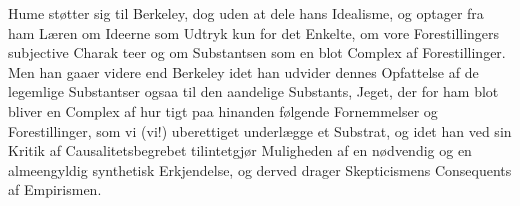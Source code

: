 \documentclass[12pt,a4paper]{book}
\begin{document}
Hume støtter sig til Berkeley, dog uden at dele hans
Idealisme, og optager fra ham Læren om Ideerne som Udtryk
kun for det Enkelte, om vore Forestillingers subjective Charak\-%
teer og om Substantsen som en blot Complex af Forestillinger.
Men han gaaer videre end Berkeley idet han udvider dennes
Opfattelse af de legemlige Substantser ogsaa til den aandelige
Substants, Jeget, der for ham blot bliver en Complex af hur\-%
tigt paa hinanden følgende Fornemmelser og Forestillinger,
som vi (vi!) uberettiget underlægge et Substrat, og idet han
ved sin Kritik af Causalitetsbegrebet tilintetgjør Muligheden af
en nødvendig og en almeengyldig synthetisk Erkjendelse, og
derved drager Skepticismens Consequents af Empirismen.
\end{document}
